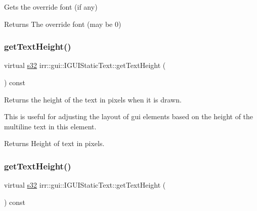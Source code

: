 Gets the override font (if any) 

\begin{DoxyReturn}{Returns}
The override font (may be 0) 
\end{DoxyReturn}
\mbox{\label{classirr_1_1gui_1_1IGUIStaticText_a88e90c238601f17e1f0b0d79c7dc1004}} 
\subsubsection{\texorpdfstring{get\+Text\+Height()}{getTextHeight()}\hspace{0.1cm}{\footnotesize\ttfamily [1/2]}}
{\footnotesize\ttfamily virtual \hyperlink{namespaceirr_ac66849b7a6ed16e30ebede579f9b47c6}{s32} irr\+::gui\+::\+I\+G\+U\+I\+Static\+Text\+::get\+Text\+Height (\begin{DoxyParamCaption}{ }\end{DoxyParamCaption}) const\hspace{0.3cm}{\ttfamily [pure virtual]}}



Returns the height of the text in pixels when it is drawn. 

This is useful for adjusting the layout of gui elements based on the height of the multiline text in this element. \begin{DoxyReturn}{Returns}
Height of text in pixels. 
\end{DoxyReturn}
\mbox{\label{classirr_1_1gui_1_1IGUIStaticText_a88e90c238601f17e1f0b0d79c7dc1004}} 
\subsubsection{\texorpdfstring{get\+Text\+Height()}{getTextHeight()}\hspace{0.1cm}{\footnotesize\ttfamily [2/2]}}
{\footnotesize\ttfamily virtual \hyperlink{namespaceirr_ac66849b7a6ed16e30ebede579f9b47c6}{s32} irr\+::gui\+::\+I\+G\+U\+I\+Static\+Text\+::get\+Text\+Height (\begin{DoxyParamCaption}{ }\end{DoxyParamCaption}) const\hspace{0.3cm}{\ttfamily [pure virtual]}}



